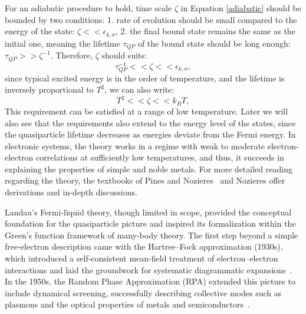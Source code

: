 For an adiabatic procedure to hold, time scale $\zeta$ in Equation \ref{adiabatic} should be bounded by two conditions: 1. rate of evolution should be small compared to the energy of the state: $\zeta << \epsilon_{k,\sigma}$, 2. the final bound state remains the same as the initial one, meaning the lifetime $\tau_{QP}$ of the bound state should be long enough: $\tau_{QP} >> \zeta^{-1}$. Therefore, $\zeta$ should suits: 
\begin{equation}
	\tau_{QP}^{-1} << \zeta << \epsilon_{k,\sigma},
\end{equation}
since typical excited energy is in the order of temperature, and the lifetime is inversely proportional to $T^2$, we can also write:
\begin{equation}
	T^2 << \zeta << k_B T,
\end{equation}
This requirement can be satisfied at a range of low temperature. Later we will also see that the requirements also extend to the energy level of the states, since the quasiparticle lifetime decreases as energies deviate from the Fermi energy. 
In electronic systems, the theory works in a regime with weak to moderate electron-electron correlations at sufficiently low temperatures, and thus, it succeeds in explaining the properties of simple and noble metals. For more detailed reading regarding the theory, the textbooks of Pines and Nozieres~\cite{nozieresTheoryQuantumLiquids2018} and Nozieres \cite{nozieresDerivationLandauTheory1962} offer derivations and in-depth discussions. 

Landau’s Fermi-liquid theory, though limited in scope, provided the conceptual foundation for the quasiparticle picture and inspired its formalization within the Green’s function framework of many-body theory. The first step beyond a simple free-electron description came with the Hartree–Fock approximation (1930s), which introduced a self-consistent mean-field treatment of electron–electron interactions and laid the groundwork for systematic diagrammatic expansions~\cite{fockNaeherungsmethodeZurLoesung1930,slaterNoteHartreesMethod1930}. In the 1950s, the Random Phase Approximation (RPA) extended this picture to include dynamical screening, successfully describing collective modes such as plasmons and the optical properties of metals and semiconductors~\cite{bohmCollectiveDescriptionElectron1951,nozieresCorrelationEnergyFree1958}.

